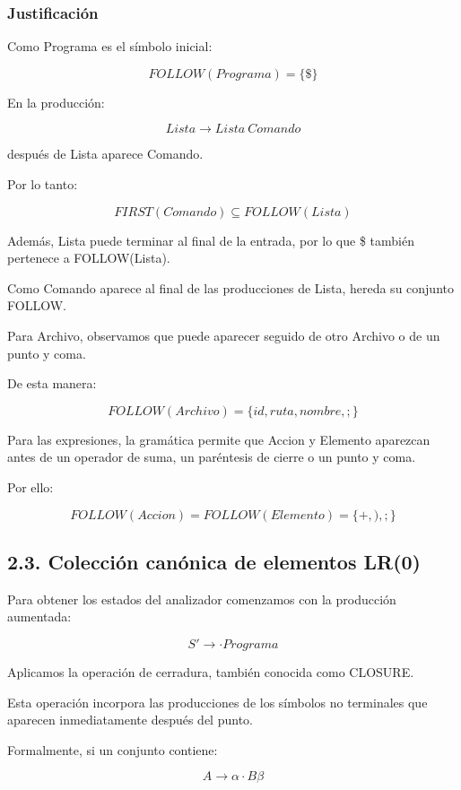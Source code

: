 \documentclass[11pt,letterpaper]{article}
\begin{document}
\subsubsection*{Justificación}

Como Programa es el símbolo inicial:

\[
FOLLOW(Programa)=\{\$\}
\]

En la producción:

\[
Lista \rightarrow Lista\ Comando
\]

después de Lista aparece Comando.

Por lo tanto:

\[
FIRST(Comando)\subseteq FOLLOW(Lista)
\]

Además, Lista puede terminar al final de la entrada,
por lo que \$ también pertenece a FOLLOW(Lista).

Como Comando aparece al final de las producciones
de Lista, hereda su conjunto FOLLOW.

Para Archivo, observamos que puede aparecer
seguido de otro Archivo o de un punto y coma.

De esta manera:

\[
FOLLOW(Archivo)=\{id,ruta,nombre,;\}
\]

Para las expresiones, la gramática permite que
Accion y Elemento aparezcan antes de un operador
de suma, un paréntesis de cierre o un punto y coma.

Por ello:

\[
FOLLOW(Accion)=FOLLOW(Elemento)=\{+,),;\}
\]


\subsection*{2.3. Colección canónica de elementos LR(0)}

Para obtener los estados del analizador comenzamos
con la producción aumentada:

\[
S' \rightarrow \cdot Programa
\]

Aplicamos la operación de cerradura, también
conocida como CLOSURE.

Esta operación incorpora las producciones de los
símbolos no terminales que aparecen inmediatamente
después del punto.

Formalmente, si un conjunto contiene:

\[
A \rightarrow \alpha \cdot B\beta
\]
\end{document}
